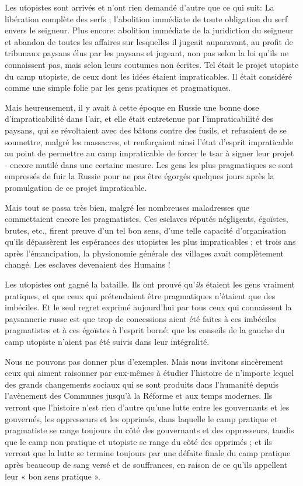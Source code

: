 Les utopistes sont arrivés et n'ont rien demandé d'autre que ce qui suit: La libération complète des serfs ; l'abolition immédiate de toute obligation du serf envers le seigneur. Plus encore: abolition immédiate de la juridiction du seigneur et abandon de toutes les affaires sur lesquelles il jugeait auparavant, au profit de tribunaux paysans élus par les paysans et jugeant, non pas selon la loi qu'ils ne connaissent pas, mais selon leurs coutumes non écrites. Tel était le projet utopiste du camp utopiste, de ceux dont les idées étaient impraticables. Il était considéré comme une simple folie par les gens pratiques et pragmatiques.

Mais heureusement, il y avait à cette époque en Russie une bonne dose d'impraticabilité dans l'air, et elle était entretenue par l'impraticabilité des paysans, qui se révoltaient avec des bâtons contre des fusils, et refusaient de se soumettre, malgré les massacres, et renforçaient ainsi l'état d'esprit impraticable au point de permettre au camp impraticable de forcer le tsar à signer leur projet - encore mutilé dans une certaine mesure. Les gens les plus pragmatiques se sont empressés de fuir la Russie pour ne pas être égorgés quelques jours après la promulgation de ce projet impraticable.

Mais tout se passa très bien, malgré les nombreuses maladresses que commettaient encore les pragmatistes. Ces esclaves réputés négligents, égoïstes, brutes, etc., firent preuve d'un tel bon sens, d'une telle capacité d'organisation qu'ils dépassèrent les espérances des utopistes les plus impraticables ; et trois ans après l'émancipation, la physionomie générale des villages avait complètement changé. Les esclaves devenaient des Humains !

Les utopistes ont gagné la bataille. Ils ont prouvé qu'\emph{ils} étaient les gens vraiment pratiques, et que ceux qui prétendaient être pragmatiques n’étaient que des imbéciles. Et le seul regret exprimé aujourd'hui par tous ceux qui connaissent la paysannerie russe est que trop de concessions aient été faites à ces imbéciles pragmatistes et à ces égoïstes à l’esprit borné: que les conseils de la gauche du camp utopiste n'aient pas été suivis dans leur intégralité.

Nous ne pouvons pas donner plus d'exemples. Mais nous invitons sincèrement ceux qui aiment raisonner par eux-mêmes à étudier l'histoire de n'importe lequel des grands changements sociaux qui se sont produits dans l'humanité depuis l'avènement des Communes jusqu'à la Réforme et aux temps modernes. Ils verront que l'histoire n'est rien d'autre qu'une lutte entre les gouvernants et les gouvernés, les oppresseurs et les opprimés, dans laquelle le camp pratique et pragmatiste se range toujours du côté des gouvernants et des oppresseurs, tandis que le camp non pratique et utopiste se range du côté des opprimés ; et ils verront que la lutte se termine toujours par une défaite finale du camp pratique après beaucoup de sang versé et de souffrances, en raison de ce qu'ils appellent leur « bon sens pratique ».

